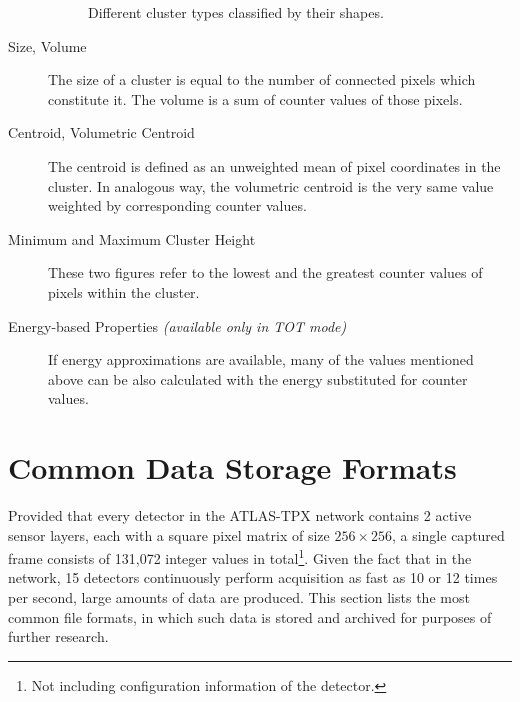 \begin{description}
\begin{figure}[t]
\begin{center}

    \caption{Different cluster types classified by their shapes.}
    \label{fig:cluster-types}
    \end{center}
    \end{figure}

	\item[Size, Volume]
	The size of a cluster is equal to the number of connected pixels which constitute it. The volume is a sum of counter values of those pixels.

	\item[Centroid, Volumetric Centroid]
	The centroid is defined as an unweighted mean of pixel coordinates in the cluster. In analogous way, the volumetric centroid is the very same value weighted by corresponding counter values. 

	\item[Minimum and Maximum Cluster Height]
	These two figures refer to the lowest and the greatest counter values of pixels within the cluster.

	\item[Energy-based Properties \textit{(available only in TOT mode)}]
	If energy approximations are available, many of the values mentioned above can be also calculated with the energy substituted for counter values.
\end{description}

\section{Common Data Storage Formats}
\label{db:storage-formats}
Provided that every detector in the ATLAS-TPX network contains 2 active sensor layers, each with a square pixel matrix of size $256\times 256$, a single captured frame consists of 131,072 integer values in total\footnote{Not including configuration information of the detector.}. Given the fact that in the network, 15 detectors continuously perform acquisition as fast as 10 or 12 times per second, large amounts of data are produced. This section lists the most common file formats, in which such data is stored and archived for purposes of further research.

